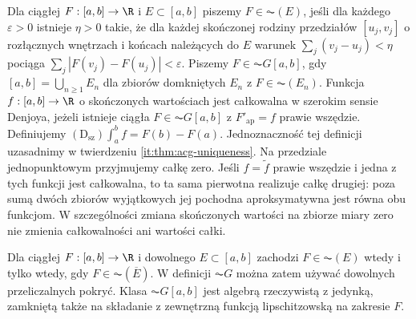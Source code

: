 \begin{definicja}\label{it:def:denjoy-broad}
Dla ciągłej $F:[a,b]\to\R$ i $E\subset[a,b]$ piszemy $F\in\AC(E)$, jeśli dla każdego $\varepsilon>0$ istnieje $\eta>0$ takie, że dla każdej skończonej rodziny przedziałów $[u_j,v_j]$ o rozłącznych wnętrzach i końcach należących do $E$ warunek $\sum_j(v_j-u_j)<\eta$ pociąga $\sum_j|F(v_j)-F(u_j)|<\varepsilon$. Piszemy $F\in\AC G[a,b]$, gdy $[a,b]=\bigcup_{n\ge1}E_n$ dla zbiorów domkniętych $E_n$ z $F\in\AC(E_n)$. Funkcja $f:[a,b]\to\R$ o skończonych wartościach jest całkowalna w szerokim sensie Denjoya, jeżeli istnieje ciągła $F\in\AC G[a,b]$ z $F'_{\mathrm{ap}}=f$ prawie wszędzie. Definiujemy $(\mathrm D_{\mathrm{sz}})\int_a^b f=F(b)-F(a)$. Jednoznaczność tej definicji uzasadnimy w twierdzeniu \ref{it:thm:acg-uniqueness}. Na przedziale jednopunktowym przyjmujemy całkę zero.
Jeśli $f=\widetilde f$ prawie wszędzie i jedna z tych
funkcji jest całkowalna, to ta sama pierwotna realizuje
całkę drugiej: poza sumą dwóch zbiorów wyjątkowych jej
pochodna aproksymatywna jest równa obu funkcjom.
W szczególności zmiana skończonych wartości na zbiorze
miary zero nie zmienia całkowalności ani wartości całki.
\end{definicja}
\begin{twierdzenie}
\label{ma1:kh:thm:acg-algebra}\label{it:thm:acg-closure-algebra}
Dla ciągłej $F:[a,b]\to\R$ i dowolnego $E\subset[a,b]$
zachodzi $F\in\AC(E)$ wtedy i tylko wtedy, gdy $F\in\AC(\overline E)$.
W definicji $\AC G$ można zatem używać dowolnych przeliczalnych
pokryć. Klasa $\AC G[a,b]$ jest algebrą rzeczywistą z jedynką,
zamkniętą także na składanie z zewnętrzną funkcją lipschitzowską
na zakresie $F$.
\end{twierdzenie}
